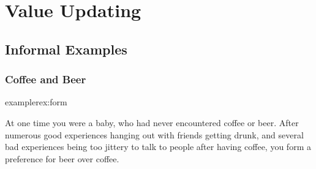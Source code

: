 \documentclass{article}
\begin{document}
	\section{Value Updating}
%	


	\subsection{Informal Examples}
	\subsubsection{Coffee and Beer}
	\begin{restatable}{example}{rex:form} \label{rex:form}

		At one time you were a baby, who had never encountered coffee or beer. After numerous good experiences hanging out with friends getting drunk, and several bad experiences being too jittery to talk to people after having coffee, you form a preference for beer over coffee.
	\end{restatable}
	
\end{document}
